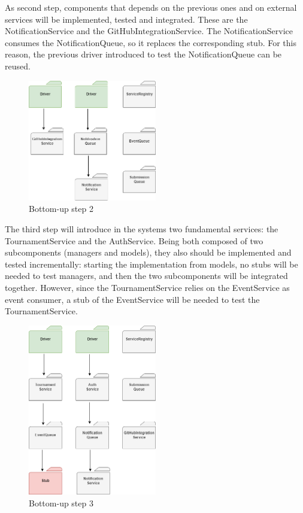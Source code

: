 As second step, components that depends on the previous ones and on external services will be implemented, tested and integrated. These are the NotificationService and the GitHubIntegrationService.
The NotificationService consumes the NotificationQueue, so it replaces the corresponding stub. For this reason, the previous driver introduced to test the NotificationQueue can be reused.
\begin{figure}[H]
    \centering
    \includegraphics[width=0.5\textwidth]{Diagrams/integration_2.png}
    \caption{Bottom-up step 2}
\end{figure}

The third step will introduce in the systems two fundamental services: the TournamentService and the AuthService. Being both composed of two subcomponents (managers and models), they also should be implemented and tested incrementally:
starting the implementation from models, no stubs will be needed to test managers, and then the two subcomponents will be integrated together.
However, since the TournamentService relies on the EventService as event consumer, a stub of the EventService will be needed to test the TournamentService.
\begin{figure}[H]
    \centering
    \includegraphics[width=0.5\textwidth]{Diagrams/integration_3.png}
    \caption{Bottom-up step 3}
\end{figure}

